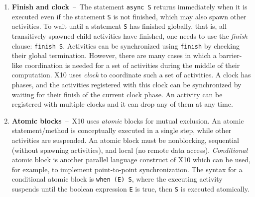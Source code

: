 \begin{enumerate}
\item{\bf Finish and clock}~--~The statement {\tt async S} returns immediately when it is executed even if the statement {\tt S} is not finished, which may also spawn other activities. To wait until a statement {\tt S} has finished globally, that is, all transitively spawned child activities have finished, one needs to use the {\it finish} clause: {\tt finish S}. %
Activities can be synchronized using {\tt finish} by checking their global termination. However, there are many cases in which a barrier-like coordination is needed for a set of activities during the middle of their computation. X10 uses {\em clock} to coordinate such a set of activities. A clock has phases, and the activities registered with this clock can be synchronized by waiting for their finish of the current clock phase. An activity can be registered with multiple clocks and it can drop any of them at any time.
\item{\bf Atomic blocks}~--~X10 uses {\em atomic} blocks for mutual exclusion. An atomic statement/method is conceptually executed in a single step, while other activities are suspended. An atomic block must be nonblocking, sequential (without spawning activities), and local (no remote data access). %
{\em Conditional} atomic block is another parallel language construct of X10 which can be used, for example, to implement point-to-point synchronization. The syntax for a conditional atomic block is {\tt when (E) S}, where the executing activity suspends until the boolean expression {\tt E} is true, then {\tt S} is executed atomically. 
\end{enumerate}



